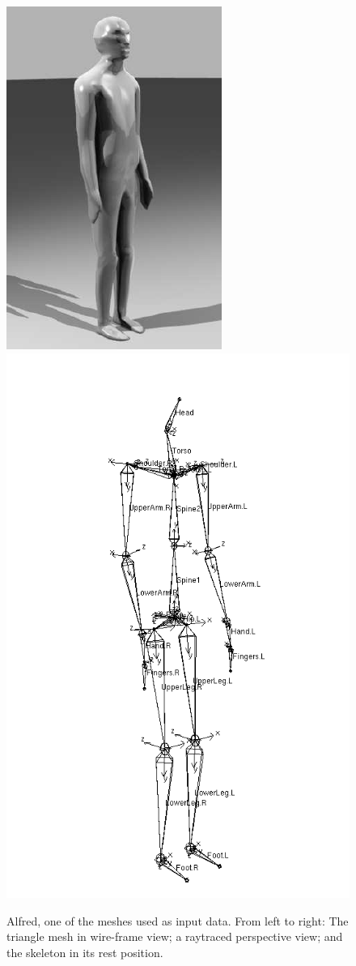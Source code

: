 \begin{figure}
{    \includegraphics{figures/alfred-rendered}
    \includegraphics{figures/alfred-skeleton}}
\caption{Alfred, one of the meshes used as input data. From left to right: The triangle mesh in
    wire-frame view; a raytraced perspective view; and the skeleton in its rest position.
    \label{alfredFigure}}
\end{figure}
